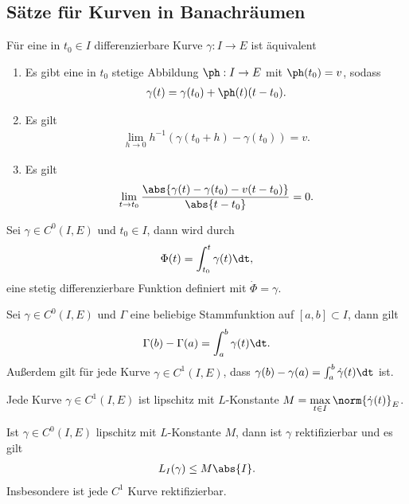 \subsection{Sätze für Kurven in Banachräumen}
\begin{prop}
Für eine in $t_0\in I$ differenzierbare Kurve $\gamma: I\to E$ ist äquivalent
\begin{enumerate}
  \item Es gibt eine in $t_0$ stetige Abbildung $\ph: I\to E$ mit $\ph(t_0) =
  v$, sodass
  \begin{align*}
  \gamma(t) = \gamma(t_0) + \ph(t)(t-t_0).
  \end{align*}
  \item Es gilt
  \begin{align*}
  \lim\limits_{h\to0} h^{-1}(\gamma(t_0+h)-\gamma(t_0)) = v.
  \end{align*}
  \item Es gilt
  \begin{align*}
  \lim\limits_{t\to t_0}
  \frac{\abs{\gamma(t)-\gamma(t_0)-v(t-t_0)}}{\abs{t-t_0}} = 0.
  \end{align*}
\end{enumerate}
\end{prop}
\begin{prop}
Sei $\gamma\in C^0(I,E)$ und $t_0\in I$, dann wird durch
\begin{align*}
\Phi(t) = \int_{t_0}^t \gamma(t)\dt,
\end{align*}
eine stetig differenzierbare Funktion definiert mit
$\dot{\Phi}=\gamma$.
\end{prop}
\begin{prop}
Sei $\gamma\in C^0(I,E)$ und $\Gamma$ eine beliebige Stammfunktion auf
$[a,b]\subset I$, dann gilt
\begin{align*}
\Gamma(b) - \Gamma(a) = \int_a^b\gamma(t)\dt.
\end{align*}
Außerdem gilt für jede Kurve $\gamma\in C^1(I,E)$, dass $\gamma(b)-\gamma(a) =
\int_a^b\dot{\gamma}(t)\dt$ ist.
\end{prop}
\begin{prop}
Jede Kurve $\gamma\in C^1(I,E)$ ist lipschitz mit $L$-Konstante $M =
\max\limits_{t\in I} \norm{\dot{\gamma}(t)}_E$.
\end{prop}
\begin{prop}
Ist $\gamma\in C^0(I,E)$ lipschitz mit $L$-Konstante $M$, dann ist
$\gamma$ rektifizierbar und es gilt
\begin{align*}
L_I(\gamma) \le M\abs{I}.
\end{align*}
Insbesondere ist jede $C^1$ Kurve rektifizierbar.
\end{prop}
